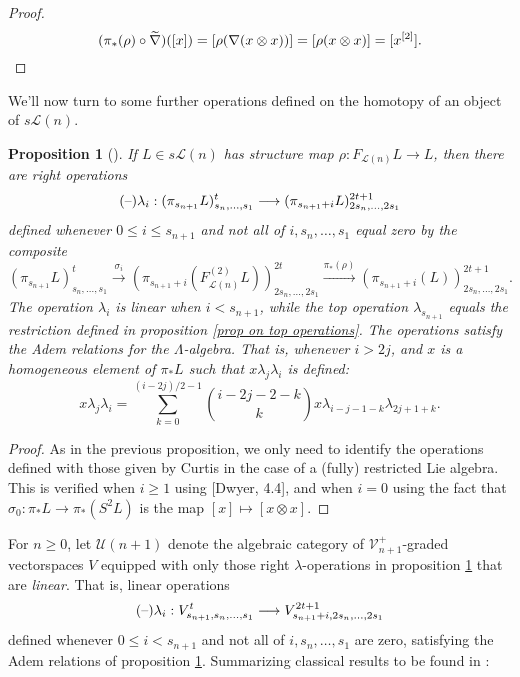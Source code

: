 \documentclass[11pt]{amsart}
\theoremstyle{plain}
\newtheorem{prop}[thm]{Proposition}
\theoremstyle{definition}
\newcommand{\DASH}{\textup{--}}
\renewcommand{\to}{\longrightarrow}
\newcommand{\calU}{\mathcal{U}}
\newcommand{\calL}{\mathcal{L}}
\newcommand{\calV}{\mathcal{V}}
\theoremstyle{plain}
\newcommand{\restn}[1]{#1^{[2]}}
\newcommand{\vect}[2]{\calV^{#1}_{#2}}
\begin{document}
\begin{homotopy operations for PRLs}
\begin{proof}
\[(\pi_*(\rho)\circ\widetilde{\nabla})([x])=[\rho(\nabla(x\otimes x))]=[\rho(x\otimes x)]=[\restn{x}].\qedhere\]
\end{proof}
We'll now turn to some further operations defined on the homotopy of an object of $s\calL(n)$.
\begin{prop}[\cite{CurtisSimplicialHtpy.pdf,6Author.pdf}]\label{linear operations on homotopy of lie alg}
If $L\in s\calL(n)$ has structure map $\rho:F_{\calL(n)}L\to L$, then there are right operations
\[(\DASH)\lambda_i:(\pi_{s_{n+1}}L)_{s_n,\ldots,s_1}^t\to (\pi_{s_{n+1}+i}L)_{2s_n,\ldots,2s_1}^{2t+1}\]
defined whenever $0\leq i\leq s_{n+1}$ and not all of $i,s_n,\ldots,s_1$ equal zero by the composite
\[(\pi_{s_{n+1}}L)_{s_n,\ldots,s_1}^t\overset{\sigma_i}{\to}(\pi_{s_{n+1}+i}(F^{(2)}_{\calL(n)}L))_{2s_n,\ldots,2s_1}^{2t}\overset{\pi_*(\rho)}{\to}(\pi_{s_{n+1}+i}(L))_{2s_n,\ldots,2s_1}^{2t+1}.\]
The operation $\lambda_i$ is linear when $i<s_{n+1}$, while the top operation $\lambda_{s_{n+1}}$ equals the restriction defined in proposition \ref{prop on top operations}. The operations satisfy the Adem relations for the $\Lambda$-algebra. That is, whenever $i>2j$, and $x$ is a homogeneous element of $\pi_*L$ such that $x\lambda_j\lambda_i$ is defined:
\[x\lambda_j\lambda_i=\sum_{k=0}^{(i-2j)/2-1}{i-2j-2-k\choose k}x\lambda_{i-j-1-k}\lambda_{2j+1+k}.\]
\end{prop}
\begin{proof}
As in the previous proposition, we only need to identify the operations defined with those given by Curtis in the case of a (fully) restricted Lie algebra. This is verified when $i\geq1$ using [Dwyer, 4.4], and when $i=0$ using the fact that $\sigma_0:\pi_*L\to \pi_*(S^2L)$ is the map $[x]\mapsto[x\otimes x]$.
\end{proof}
For $n\geq0$, let $\calU(n+1)$ denote the algebraic category of $\vect{+}{n+1}$-graded vectorspaces $V$ equipped with only those right $\lambda$-operations in proposition \ref{linear operations on homotopy of lie alg} that are \emph{linear}. That is, linear operations 
\[(\DASH)\lambda_i:V_{s_{n+1},s_n,\ldots,s_1}^t\to V_{s_{n+1}+i,2s_n,\ldots,2s_1}^{2t+1}\]
defined whenever $0\leq i< s_{n+1}$ and not all of $i,s_{n},\ldots,s_{1}$ are zero, satisfying the Adem relations of proposition \ref{linear operations on homotopy of lie alg}. Summarizing classical results to be found in \cite{CurtisSimplicialHtpy.pdf}:


\end{homotopy operations for PRLs}
\end{document}
